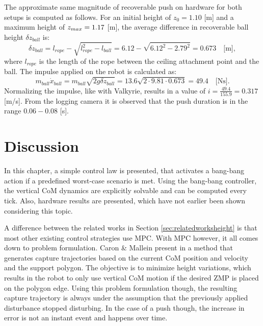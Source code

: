 The approximate same magnitude of recoverable push on hardware for both setups is computed as follows. For an initial height of $z_0=1.10$ [m] and a maximum height of $z_{max}=1.17$ [m], the average difference in recoverable ball height $\delta z_{ball}$ is:
\begin{equation}
	\delta z_{ball} = l_{rope} - \sqrt{l_{rope}^2-l_{ball}} = 6.12-\sqrt{6.12^2 - 2.79^2} = 0.673 \quad \text{[m]},
\end{equation}
where $l_{rope}$ is the length of the rope between the ceiling attachment point and the ball. The impulse applied on the robot is calculated as:
\begin{equation}
m_{ball}\dot{x}_{ball} = m_{ball}\sqrt{2g\delta z_{ball} } = 13.6\sqrt{2 \cdot 9.81 \cdot 0.673} = 49.4 \quad \text{[Ns]}.
\end{equation}
Normalizing the impulse, like with Valkyrie, results in a value of $i=\frac{49.4}{155.9}=0.317$ [m/s]. From the logging camera it is observed that the push duration is in the range $0.06-0.08$ [s].

\section{Discussion}
In this chapter, a simple control law is presented, that activates a bang-bang action if a predefined worst-case scenario is met. Using the bang-bang controller, the vertical \ac{CoM} dynamics are explicitly solvable and can be computed every tick. Also, hardware results are presented, which have not earlier been shown considering this topic. 

A difference between the related works in Section \ref{sec:relatedworksheight} is that most other existing control strategies use \ac{MPC}. With \ac{MPC} however, it all comes down to problem formulation. Caron \& Mallein present in \cite{caron2018balance} a method that generates capture trajectories based on the current \ac{CoM} position and velocity and the support polygon. The objective is to minimize height variations, which results in the robot to only use vertical \ac{CoM} motion if the desired \ac{ZMP} is placed on the polygon edge. Using this problem formulation though, the resulting capture trajectory is always under the assumption that the previously applied disturbance stopped disturbing. In the case of a push though, the increase in error is not an instant event and happens over time.

